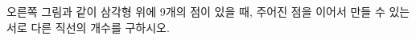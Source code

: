 \noindent\begin{minipage}[t]{0.58\linewidth}\vspace{0pt}\raggedright 오른쪽 그림과 같이 삼각형 위에 9개의 점이 있을 때, 주어진 점을 이어서 만들 수 있는 서로 다른 직선의 개수를 구하시오.\end{minipage}\hfill\begin{minipage}[t]{0.4\linewidth}\vspace{0pt}\centering \resizebox{\ifdim\width>\linewidth\linewidth\else\width\fi}{!}{}\end{minipage}\par
